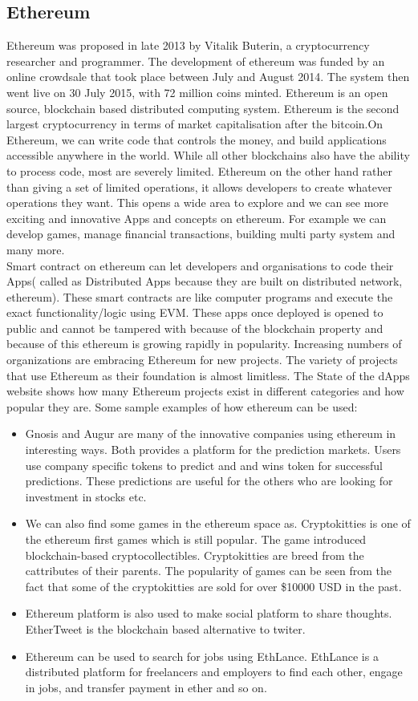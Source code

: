 \documentclass{article}
\begin{document}
\subsection*{Ethereum}
Ethereum was proposed in late 2013 by Vitalik Buterin, a cryptocurrency researcher and programmer. The development of ethereum was funded by an online crowdsale that took place between July and August 2014. The system then went live on 30 July 2015, with 72 million coins minted. Ethereum is an open source, blockchain based distributed computing system. Ethereum is the second largest cryptocurrency in terms of market capitalisation after the bitcoin.On Ethereum, we can write code that controls the money, and build applications accessible anywhere in the world. While all other blockchains also have the ability to process code, most are severely limited. Ethereum on the other hand rather than giving a set of limited operations, it allows developers to create whatever operations they want. This opens a wide area to explore and we can see more exciting and innovative Apps and concepts on ethereum. For example we can develop games, manage financial transactions, building multi party system and many more. 
\\ 
Smart contract on ethereum can let developers and organisations to code their Apps( called as Distributed Apps because they are built on distributed network, ethereum). These smart contracts are like computer programs and execute the exact functionality/logic using EVM. These apps once deployed is opened to public and cannot be tampered with because of the blockchain property and because of this ethereum is growing rapidly in popularity. Increasing numbers of organizations are embracing Ethereum for new projects. The variety of projects that use Ethereum as their foundation is almost limitless. 
The State of the dApps website shows how many Ethereum projects exist in different categories and how popular they are. Some sample examples of how ethereum can be used:\\
\begin{itemize}
    \item Gnosis and Augur are many of the innovative companies using ethereum in interesting ways. Both provides a platform for the prediction markets. Users use company specific tokens to predict and and wins token for successful predictions. These predictions are useful for the others who are looking for investment in stocks etc.
    \item We can also find some games in the ethereum space as. Cryptokitties is one of the ethereum first games which is still popular. The game introduced blockchain-based cryptocollectibles. Cryptokitties are breed from the cattributes of their parents. The popularity of games can be seen from the fact that some of the cryptokitties are sold for over \$10000 USD in the past.
    \item  Ethereum platform is also used to make social platform to share thoughts. EtherTweet is the blockchain based alternative to twiter.
    \item Ethereum can be used to search for jobs using EthLance. EthLance is a distributed platform for freelancers and employers to find each other, engage in jobs, and transfer payment in ether and so on.
\end{itemize}
\end{document}
